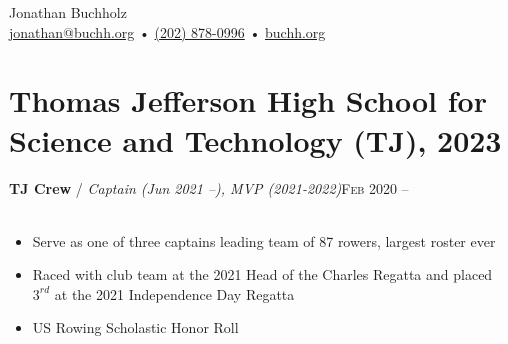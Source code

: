 \documentclass[12pt, a4paper]{article}
\begin{document}
{\LARGE Jonathan Buchholz}\\
\href{mailto:jonathan@buchh.org}{jonathan@buchh.org} • \href{tel:2028780996}{(202) 878-0996} • \href{https://buchh.org}{buchh.org}\\


\vspace{-12mm}
\section*{Thomas Jefferson High School for Science and Technology (TJ), 2023}





\vspace{-2mm}
\textbf{TJ Crew} / \textit{Captain (Jun 2021 --), MVP (2021-2022)}\hfill\textsc{Feb 2020 --}\\\
\begin{itemize}
    \vspace{-8mm}
    \item Serve as one of three captains leading team of 87 rowers, largest roster ever
    \item Raced with club team at the 2021 Head of the Charles Regatta and placed $3^{rd}$ at the 2021 Independence Day Regatta
    \item US Rowing Scholastic Honor Roll
\end{itemize}
\end{document}
